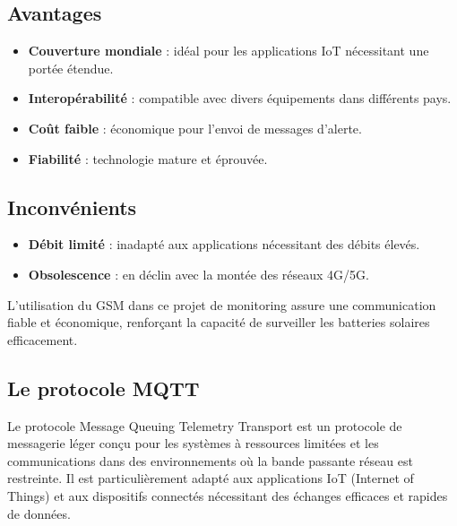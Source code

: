 \subsection*{Avantages}
\begin{itemize}
	\item \textbf{Couverture mondiale} : idéal pour les applications IoT nécessitant une portée étendue.
	\item \textbf{Interopérabilité} : compatible avec divers équipements dans différents pays.
	\item \textbf{Coût faible} : économique pour l'envoi de messages d'alerte.
	\item \textbf{Fiabilité} : technologie mature et éprouvée.
\end{itemize}

\subsection*{Inconvénients}
\begin{itemize}
	\item \textbf{Débit limité} : inadapté aux applications nécessitant des débits élevés.
	\item \textbf{Obsolescence} : en déclin avec la montée des réseaux 4G/5G.
\end{itemize}

L'utilisation du GSM dans ce projet de monitoring assure une communication fiable et économique, renforçant la capacité de surveiller les batteries solaires efficacement.

\subsection{Le protocole MQTT}  
Le protocole Message Queuing Telemetry Transport est un protocole de messagerie léger conçu pour les systèmes à ressources limitées et les communications dans des environnements où la bande passante réseau est restreinte. Il est particulièrement adapté aux applications IoT (Internet of Things) et aux dispositifs connectés nécessitant des échanges efficaces et rapides de données.  

